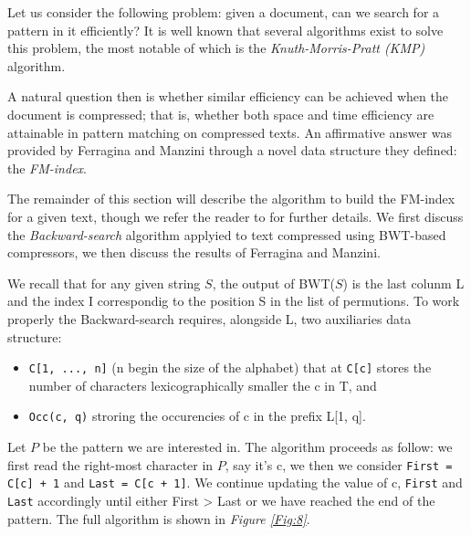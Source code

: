 \documentclass{subfiles}
\begin{document}
    Let us consider the following problem: given a document, 
        can we search for a pattern in it efficiently? 
        It is well known that several algorithms exist to solve this problem,
        the most notable of which is the \emph{Knuth-Morris-Pratt (KMP)} algorithm. 

    A natural question then is whether similar efficiency can be achieved when the 
        document is compressed; that is, whether both space and time efficiency are attainable
        in pattern matching on compressed texts. 
        An affirmative answer was provided by Ferragina and Manzini through a novel data structure
        they defined: the \emph{FM-index}.

    The remainder of this section will describe the algorithm to build the FM-index for a given text, 
        though we refer the reader to \cite{ferragina2000} for further details.
        We first discuss the \emph{Backward-search} algorithm applyied to text compressed using
        BWT-based compressors, we then discuss the results of Ferragina and Manzini.

    We recall that for any given string \(S\), the output of BWT(\(S\)) is the last colunm L 
        and the index I correspondig to the position S in the list of permutions.
        To work properly the Backward-search requires, alongside L, 
        two auxiliaries data structure:
        \begin{itemize}
            \item \lstinline{C[1, ..., n]} (n begin the size of the alphabet) that at
                \lstinline{C[c]} stores the number of characters lexicographically smaller the c in T, and 
            \item \lstinline{Occ(c, q)} stroring the occurencies of c in the prefix L[1, q].
        \end{itemize}

        Let \(P\) be the pattern we are interested in. 
        The algorithm proceeds as follow: we first read the right-most character in \(P\),
        say it's c, we then we consider \lstinline{First = C[c] + 1} and \lstinline{Last = C[c + 1]}. 
        We continue updating the value of c, \lstinline{First} and \lstinline{Last} accordingly 
        until either First > Last or we have reached the end of the pattern.
        The full algorithm is shown in \emph{Figure \ref{Fig:8}}.
        
\end{document}
